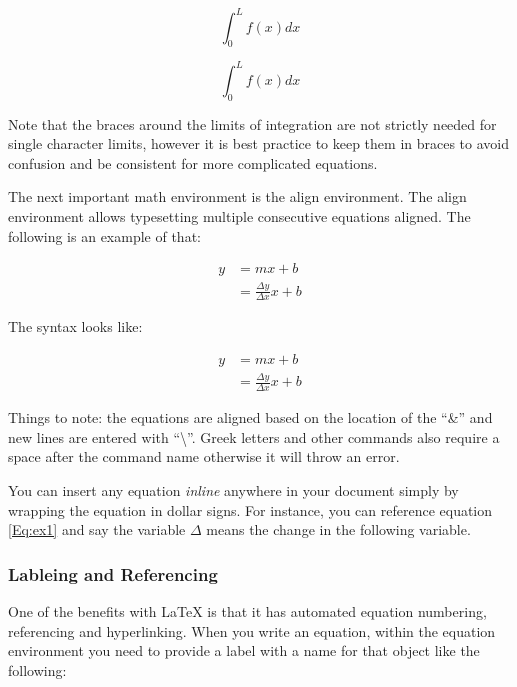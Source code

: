 \begin{equation}
	\int_{0}^{L} f(x) dx
\end{equation}

\begin{center}
\begin{latexcode}
\begin{equation}
\int_{0}^{L} f(x) dx
\end{equation}
\end{latexcode}
\end{center}

Note that the braces around the limits of integration are not strictly needed for single character limits, however it is best practice to keep them in braces to avoid confusion and be consistent for more complicated equations.

The next important math environment is the align environment. The align environment allows typesetting multiple consecutive equations aligned. The following is an example of that:

\begin{align}
y &= mx + b\\ 
  &= \frac{\Delta y}{\Delta x}x + b
\label{Eq:ex1}
\end{align}

The syntax looks like:

\begin{center}
\begin{latexcode}
\begin{align}
y &= mx + b\\ 
  &= \frac{\Delta y}{\Delta x}x + b
\label{Eq:ex1}
\end{align}
\end{latexcode}
\end{center}

Things to note: the equations are aligned based on the location of the ``\&'' and new lines are entered with ``\textbackslash''. Greek letters and other commands also require a space after the command name otherwise it will throw an error.

You can insert any equation \textit{inline} anywhere in your document simply by wrapping the equation in dollar signs. For instance, you can reference equation \ref{Eq:ex1} and say the variable $\Delta$ means the change in the following variable.

\subsubsection{Lableing and Referencing}
One of the benefits with \LaTeX{} is that it has automated equation numbering, referencing and hyperlinking. When you write an equation, within the equation environment you need to provide a label with a name for that object like the following:


